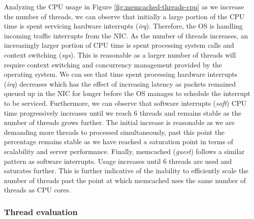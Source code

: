 Analyzing the CPU usage in Figure \ref{fig:memcached-threads-cpu} as we increase the number of threads, we can observe that initially a large portion of the CPU time is spent servicing hardware interrupts (\textit{irq}). Therefore, the OS is handling incoming traffic interrupts from the NIC. As the number of threads increases, an increasingly larger portion of CPU time is spent processing system calls and context switching (\textit{sys}). This is reasonable as a larger number of threads will require context switching and concurrency management provided by the operating system. We can see that time spent processing hardware interrupts (\textit{irq}) decreases which has the effect of increasing latency as packets remained queued up in the NIC for longer before the OS manages to schedule the interrupt to be serviced. Furthermore, we can observe that software interrupts (\textit{soft}) CPU time progressively increases until we reach 6 threads and remains stable as the number of threads grows further. The initial increase is reasonable as we are demanding more threads to processed simultaneously, past this point the percentage remains stable as we have reached a saturation point in terms of scalability and server performance. Finally, memcached (\textit{guest}) follows a similar pattern as software interrupts. Usage increases until 6 threads are used and saturates further. This is further indicative of the inability to efficiently scale the number of threads past the point at which memcached uses the same number of threads as CPU cores.

\subsubsection{Thread evaluation}








